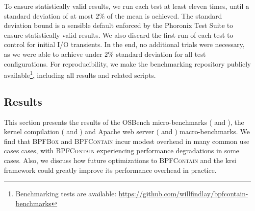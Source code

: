 \documentclass[
  fontsize=12pt,
  titlepage=firstiscover,
  paper=letter,
oneside,
  cleardoublepage=plain,
  parskip=half-,
  DIV=10,
  parindent,
  appendixprefix,
  chapterprefix,
  listof=totoc,
]{scrbook}
\newcommand{\bpfbox}{\textsc{BPFBox}}
\newcommand{\bpfcontain}{\textsc{BPFContain}}
\begin{document}
To ensure statistically valid results, we run each test at least eleven times, until
a standard deviation of at most $2\%$ of the mean is achieved. The standard deviation
bound is a sensible default enforced by the Phoronix Test Suite to ensure statistically
valid results. We also discard the first run of each test to control for initial I/O
transients. In the end, no additional trials were necessary, as we were able to achieve
under $2\%$ standard deviation for all test configurations. For reproducibility, we make
the benchmarking repository publicly available\footnote{Benchmarking tests are available:
\url{https://github.com/willfindlay/bpfcontain-benchmarks}}, including all results and
related scripts.











\subsection{Results}\label{ss:eval-results}

This section presents the results of the OSBench micro-benchmarks ( and
), the kernel
compilation ( and ) and
Apache web server ( and )
macro-benchmarks. We find that \bpfbox{} and \bpfcontain{} incur modest overhead in many
common use cases cases, with \bpfcontain{} experiencing performance degradations in some
cases. Also, we discuss how future optimizations to \bpfcontain{} and the \gls{krsi}
framework could greatly improve its performance overhead in practice.
\end{document}
